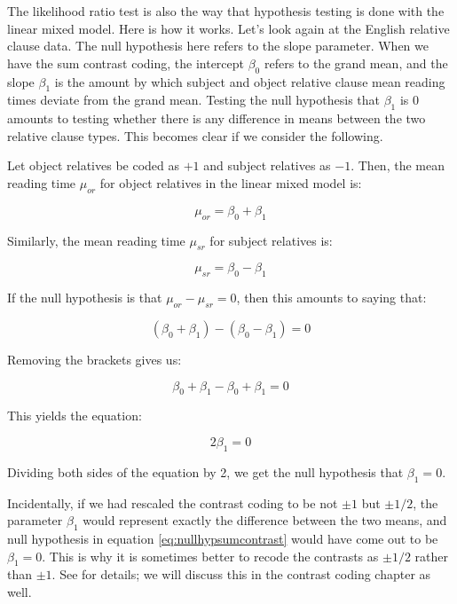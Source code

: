 \documentclass[12pt,]{krantz}
\begin{document}
The likelihood ratio test is also the way that hypothesis testing is done with the linear mixed model. Here is how it works. Let's look again at the \citet{grodner} English relative clause data. The null hypothesis here refers to the slope parameter. When we have the sum contrast coding, the intercept \(\beta_0\) refers to the grand mean, and the slope \(\beta_1\) is the amount by which subject and object relative clause mean reading times deviate from the grand mean. Testing the null hypothesis that \(\beta_1\) is 0 amounts to testing whether there is any difference in means between the two relative clause types. This becomes clear if we consider the following.

Let object relatives be coded as \(+1\) and subject relatives as \(-1\). Then, the mean reading time \(\mu_{or}\) for object relatives in the linear mixed model is:

\begin{equation}
\mu_{or}=\beta_0 + \beta_1
\end{equation}

Similarly, the mean reading time \(\mu_{sr}\) for subject relatives is:

\begin{equation}
\mu_{sr}=\beta_0 - \beta_1
\end{equation}

If the null hypothesis is that \(\mu_{or}-\mu_{sr}=0\), then this amounts to saying that:

\begin{equation}
(\beta_0 + \beta_1)-(\beta_0 - \beta_1)=0
\end{equation}

Removing the brackets gives us:

\begin{equation}
\beta_0 + \beta_1-\beta_0 + \beta_1 = 0
\end{equation}

This yields the equation:

\begin{equation} \label{eq:nullhypsumcontrast}
2\beta_1= 0
\end{equation}

Dividing both sides of the equation by 2, we get the null hypothesis that \(\beta_1=0\).

Incidentally, if we had rescaled the contrast coding to be not \(\pm 1\) but \(\pm 1/2\), the parameter \(\beta_1\) would represent exactly the difference between the two means, and null hypothesis in equation \eqref{eq:nullhypsumcontrast} would have come out to be \(\beta_1= 0\). This is why it is sometimes better to recode the contrasts as \(\pm 1/2\) rather than \(\pm 1\). See \citet{SchadEtAlcontrasts} for details; we will discuss this in the contrast coding chapter as well.
\end{document}
